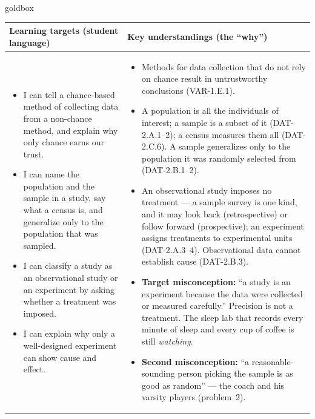 \documentclass[10pt]{article}
\begin{document}
\renewcommand{\arraystretch}{1.4}
\boxguard
\begin{skillbox}{goldbox}
\begin{tabularx}{\linewidth}{@{}X|X@{}}
\textbf{Learning targets (student language)} & \textbf{Key understandings (the ``why'')} \\[2pt]
\hline
\vspace{-6pt}
\begin{itemize}[leftmargin=1.1em, nosep, after=\vspace{2pt}]
  \item I can tell a chance-based method of collecting data from a non-chance method, and
        explain why only chance earns our trust.
  \item I can name the population and the sample in a study, say what a census is, and
        generalize only to the population that was sampled.
  \item I can classify a study as an observational study or an experiment by asking whether a
        treatment was imposed.
  \item I can explain why only a well-designed experiment can show cause and effect.
\end{itemize}
&
\vspace{-6pt}
\begin{itemize}[leftmargin=1.1em, nosep, after=\vspace{2pt}]
  \item Methods for data collection that do not rely on chance result in untrustworthy
        conclusions (VAR-1.E.1).
  \item A population is all the individuals of interest; a sample is a subset of it
        (DAT-2.A.1--2); a census measures them all (DAT-2.C.6). A sample generalizes only to
        the population it was randomly selected from (DAT-2.B.1--2).
  \item An observational study imposes no treatment --- a sample survey is one kind, and it
        may look back (retrospective) or follow forward (prospective); an experiment assigns
        treatments to experimental units (DAT-2.A.3--4). Observational data cannot establish
        cause (DAT-2.B.3).
  \item \textbf{Target misconception:} ``a study is an experiment because the data were
        collected or measured carefully.'' Precision is not a treatment. The sleep lab that
        records every minute of sleep and every cup of coffee is still \emph{watching}.
  \item \textbf{Second misconception:} ``a reasonable-sounding person picking the sample is
        as good as random'' --- the coach and his varsity players (problem~2).
\end{itemize}
\end{tabularx}
\end{skillbox}
\end{document}
